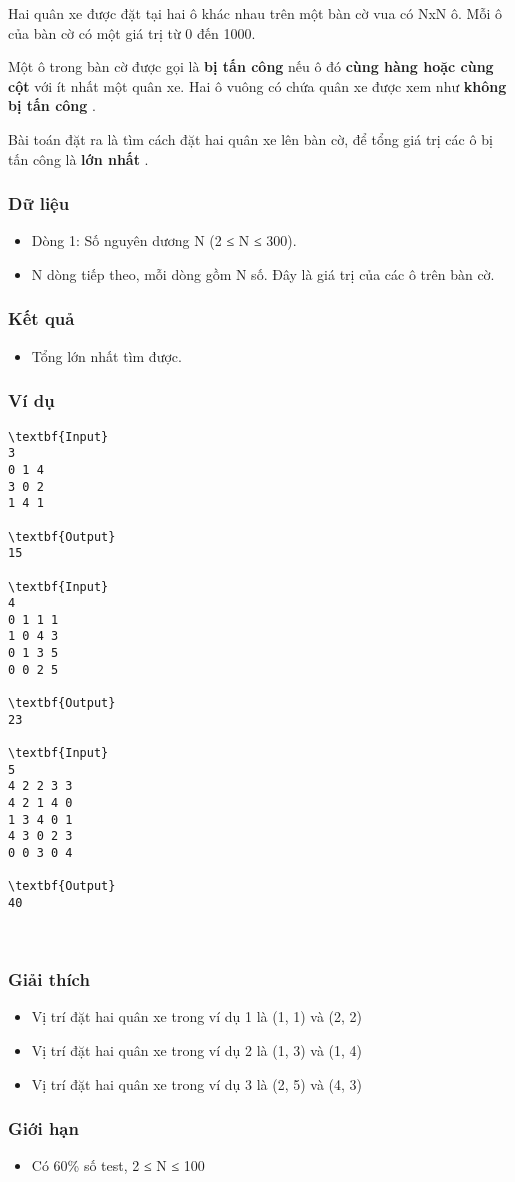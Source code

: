 

Hai quân xe được đặt tại hai ô khác nhau trên một bàn cờ vua có NxN ô. Mỗi ô của bàn cờ có một giá trị từ 0 đến 1000.

Một ô trong bàn cờ được gọi là \textbf{ bị tấn công } nếu ô đó \textbf{ cùng hàng hoặc cùng cột } với ít nhất một quân xe. Hai ô vuông có chứa quân xe được xem như \textbf{ không bị tấn công } .

Bài toán đặt ra là tìm cách đặt hai quân xe lên bàn cờ, để tổng giá trị các ô bị tấn công là \textbf{ lớn nhất } .

\subsubsection{Dữ liệu}
\begin{itemize}
	\item Dòng 1: Số nguyên dương N (2 ≤ N ≤ 300).
	\item N dòng tiếp theo, mỗi dòng gồm N số. Đây là giá trị của các ô trên bàn cờ.
\end{itemize}

\subsubsection{Kết quả}
\begin{itemize}
	\item Tổng lớn nhất tìm được.
\end{itemize}

\subsubsection{Ví dụ}
\begin{verbatim}
\textbf{Input}
3
0 1 4
3 0 2
1 4 1

\textbf{Output}
15

\textbf{Input}
4
0 1 1 1
1 0 4 3
0 1 3 5
0 0 2 5

\textbf{Output}
23

\textbf{Input}
5
4 2 2 3 3
4 2 1 4 0
1 3 4 0 1
4 3 0 2 3
0 0 3 0 4

\textbf{Output}
40\end{verbatim}

 

\subsubsection{Giải thích}
\begin{itemize}
	\item Vị trí đặt hai quân xe trong ví dụ 1 là (1, 1) và (2, 2)
	\item Vị trí đặt hai quân xe trong ví dụ 2 là (1, 3) và (1, 4)
	\item Vị trí đặt hai quân xe trong ví dụ 3 là (2, 5) và (4, 3)
\end{itemize}

\subsubsection{Giới hạn}
\begin{itemize}
	\item Có 60\% số test, 2 ≤ N ≤ 100
\end{itemize}